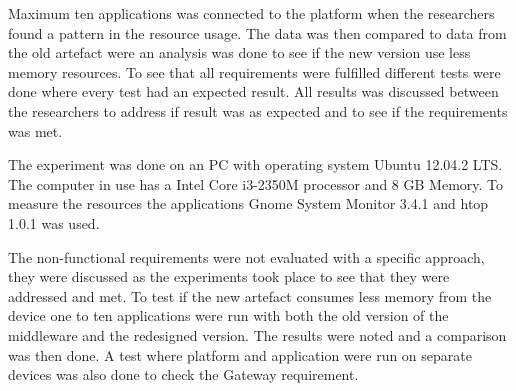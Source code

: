 Maximum ten applications was connected to the platform when the researchers found a pattern in the resource usage. The data was then compared to data from the old artefact were an analysis was done to see if the new version use less memory resources. To see that all requirements were fulfilled different tests were done where every test had an expected result. All results was discussed between the researchers to address if result was as expected and to see if the requirements was met. 

The experiment was done on an PC with operating system Ubuntu 12.04.2 LTS. The computer in use has a Intel Core i3-2350M processor and 8 GB Memory. To measure the resources the applications Gnome System Monitor 3.4.1 \cite{gnomesm} and htop 1.0.1 \cite{htop} was used. 

The non-functional requirements were not evaluated with a specific approach, they were discussed as the experiments took place to see that they were addressed and met. To test if the new artefact consumes less memory from the device one to ten applications were run with both the old version of the middleware and the redesigned version. The results were noted and a comparison was then done. A test where platform and application were run on separate devices was also done to check the Gateway requirement.
